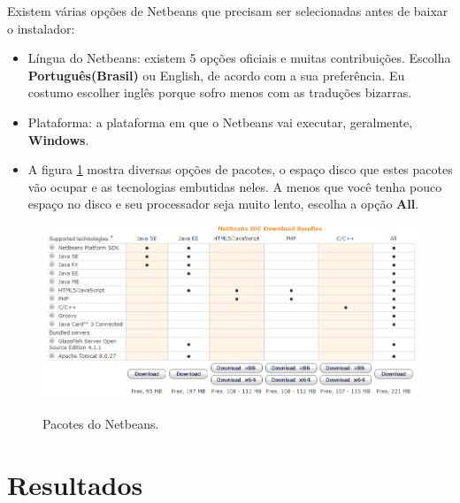 \documentclass[
	12pt,				%
	twoside,			%
	a4paper,			%
	english,			%
	french,				%
	spanish,			%
	brazil				%
	]{abntex2}
\begin{document}
Existem várias opções de Netbeans que precisam ser selecionadas antes de baixar o instalador:
\begin{itemize}
\item Língua do Netbeans: existem 5 opções oficiais e muitas contribuições. Escolha \textbf{Português(Brasil)} ou English, de acordo com a sua preferência. Eu costumo escolher inglês porque sofro menos com as traduções bizarras.
\item Plataforma: a plataforma em que o Netbeans vai executar, geralmente, \textbf{Windows}.
\item A figura \ref{fig:nb_bundles} mostra diversas opções de pacotes, o espaço disco que estes pacotes vão ocupar e as tecnologias embutidas neles. A menos que você tenha pouco espaço no disco e seu processador seja muito lento, escolha a opção \textbf{All}.
\end{itemize}

\begin{figure}[h]
\begin{center}
\includegraphics[scale=0.4]{NB_bundles.png} 
\caption{Pacotes do Netbeans.}
\label{fig:nb_bundles}
\end{center}
\end{figure}





\part{Resultados}
\end{document}

